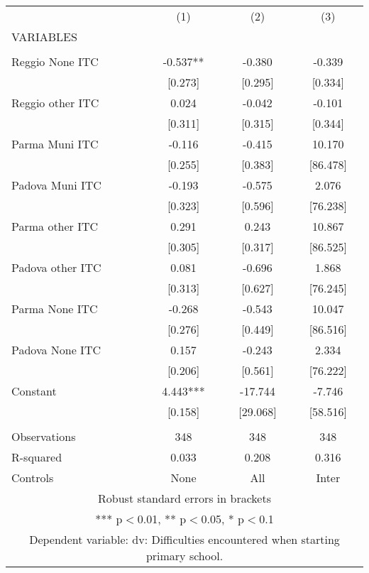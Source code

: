 \begin{tabular}{lccc} \hline
 & (1) & (2) & (3) \\
VARIABLES &  &  &  \\ \hline
 &  &  &  \\
Reggio None ITC & -0.537** & -0.380 & -0.339 \\
 & [0.273] & [0.295] & [0.334] \\
Reggio other ITC & 0.024 & -0.042 & -0.101 \\
 & [0.311] & [0.315] & [0.344] \\
Parma Muni ITC & -0.116 & -0.415 & 10.170 \\
 & [0.255] & [0.383] & [86.478] \\
Padova Muni ITC & -0.193 & -0.575 & 2.076 \\
 & [0.323] & [0.596] & [76.238] \\
Parma other ITC & 0.291 & 0.243 & 10.867 \\
 & [0.305] & [0.317] & [86.525] \\
Padova other ITC & 0.081 & -0.696 & 1.868 \\
 & [0.313] & [0.627] & [76.245] \\
Parma None ITC & -0.268 & -0.543 & 10.047 \\
 & [0.276] & [0.449] & [86.516] \\
Padova None ITC & 0.157 & -0.243 & 2.334 \\
 & [0.206] & [0.561] & [76.222] \\
Constant & 4.443*** & -17.744 & -7.746 \\
 & [0.158] & [29.068] & [58.516] \\
 &  &  &  \\
Observations & 348 & 348 & 348 \\
R-squared & 0.033 & 0.208 & 0.316 \\
 Controls & None & All & Inter \\ \hline
\multicolumn{4}{c}{ Robust standard errors in brackets} \\
\multicolumn{4}{c}{ *** p$<$0.01, ** p$<$0.05, * p$<$0.1} \\
\multicolumn{4}{c}{ Dependent variable: dv: Difficulties encountered when starting primary school.} \\
\end{tabular}
